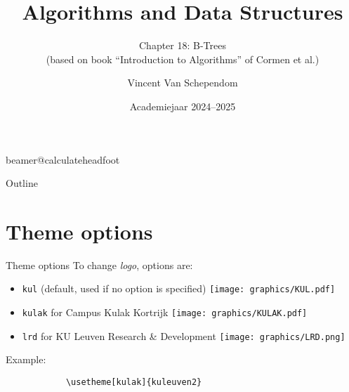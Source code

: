 \documentclass[11pt,t]{beamer}
\title[Footer]{Algorithms and Data Structures} %
\subtitle{Chapter 18: B-Trees\\(based on book “Introduction to Algorithms” of Cormen et al.)}
\author{Vincent Van Schependom}
\institute{KU Leuven Campus Kulak Kortrijk}
\date{Academiejaar 2024--2025}
\begin{document}
	\csname beamer@calculateheadfoot\endcsname %


	\begin{frame}
		\titlepage
	\end{frame}


	\begin{frame}{Outline}
		\hfill	{\large \parbox{.961\textwidth}{\tableofcontents[hideothersubsections]}}
	\end{frame}







	\section{Theme options}
	\begin{frame}[fragile]{Theme options}  %
		To change \emph{logo}, options are:
		\begin{itemize}
			\item \texttt{kul} \qquad (default, used if no option is specified) \texttt{[image: graphics/KUL.pdf]}
			\item \texttt{kulak} \quad for Campus Kulak Kortrijk \texttt{[image: graphics/KULAK.pdf]}
			\item \texttt{lrd} \qquad for KU Leuven Research \& Development \texttt{[image: graphics/LRD.png]}
		\end{itemize}

		\vspace{24pt}
		Example:
		\begin{verbatim}
			\usetheme[kulak]{kuleuven2}
		\end{verbatim}
	\end{frame}
\end{document}
